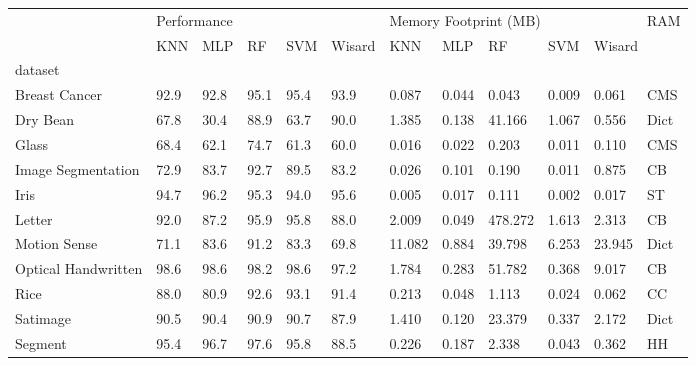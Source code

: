 \begin{tabular}{llllllllllll}
\toprule
{} & \multicolumn{5}{l}{Performance} & \multicolumn{5}{l}{Memory Footprint (MB)} &   RAM \\
{} &         KNN &   MLP &    RF &   SVM & Wisard &                   KNN &    MLP &       RF &    SVM & \multicolumn{2}{l}{Wisard} \\
dataset             &             &       &       &       &        &                       &        &          &        &         &       \\
\midrule
Breast Cancer       &        92.9 &  92.8 &  95.1 &  95.4 &   93.9 &                 0.087 &  0.044 &    0.043 &  0.009 &   0.061 &   CMS \\
Dry Bean            &        67.8 &  30.4 &  88.9 &  63.7 &   90.0 &                 1.385 &  0.138 &   41.166 &  1.067 &   0.556 &  Dict \\
Glass               &        68.4 &  62.1 &  74.7 &  61.3 &   60.0 &                 0.016 &  0.022 &    0.203 &  0.011 &   0.110 &   CMS \\
Image Segmentation  &        72.9 &  83.7 &  92.7 &  89.5 &   83.2 &                 0.026 &  0.101 &    0.190 &  0.011 &   0.875 &    CB \\
Iris                &        94.7 &  96.2 &  95.3 &  94.0 &   95.6 &                 0.005 &  0.017 &    0.111 &  0.002 &   0.017 &    ST \\
Letter              &        92.0 &  87.2 &  95.9 &  95.8 &   88.0 &                 2.009 &  0.049 &  478.272 &  1.613 &   2.313 &    CB \\
Motion Sense        &        71.1 &  83.6 &  91.2 &  83.3 &   69.8 &                11.082 &  0.884 &   39.798 &  6.253 &  23.945 &  Dict \\
Optical Handwritten &        98.6 &  98.6 &  98.2 &  98.6 &   97.2 &                 1.784 &  0.283 &   51.782 &  0.368 &   9.017 &    CB \\
Rice                &        88.0 &  80.9 &  92.6 &  93.1 &   91.4 &                 0.213 &  0.048 &    1.113 &  0.024 &   0.062 &    CC \\
Satimage            &        90.5 &  90.4 &  90.9 &  90.7 &   87.9 &                 1.410 &  0.120 &   23.379 &  0.337 &   2.172 &  Dict \\
Segment             &        95.4 &  96.7 &  97.6 &  95.8 &   88.5 &                 0.226 &  0.187 &    2.338 &  0.043 &   0.362 &    HH \\

\end{tabular}
